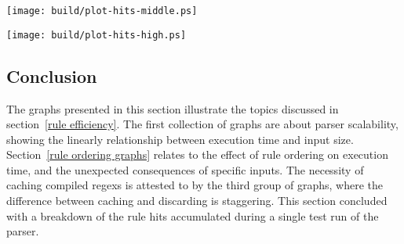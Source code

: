 \documentclass[a4paper,12pt,draft]{article}
\begin{document}
\noindent\texttt{[image: build/plot-hits-middle.ps]}

\noindent\texttt{[image: build/plot-hits-high.ps]}

\subsection{Conclusion}

The graphs presented in this section illustrate the topics discussed in
section~\ref{rule efficiency}.  The first collection of graphs are about
parser scalability, showing the linearly relationship between execution
time and input size.  Section~\ref{rule ordering graphs} relates to the
effect of rule ordering on execution time, and the unexpected consequences
of specific inputs.  The necessity of caching compiled regexs is attested
to by the third group of graphs, where the difference between caching and
discarding is staggering.  This section concluded with a breakdown of the
rule hits accumulated during a single test run of the parser.
\end{document}
